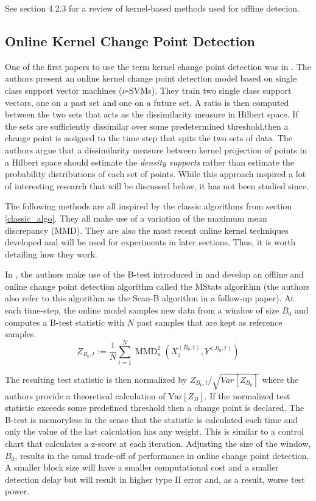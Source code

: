 See section 4.2.3 \cite{truong2018review} for a review of kernel-based methods used for offline detecion. 

\subsection{Online Kernel Change Point Detection}
One of the first papers to use the term kernel change point detection was in \cite{desobry2005online}. The authors present an online kernel change point detection model based on single class support vector machines ($\nu$-SVMs). They train two single class support vectors, one on a past set and one on a future set. A ratio is then computed between the two sets that acts as the dissimilarity measure in Hilbert space. If the sets are sufficiently dissimilar over some predetermined threshold,then a change point is assigned to the time step that spits the two sets of data. The authors argue that a dissimilarity measure between kernel projection of points in a Hilbert space should estimate the \textit{density supports} rather than estimate the probability distributions of each set of points. While this approach inspired a lot of interesting research that will be discussed below, it has not been studied since.

The following methods are all inspired by the classic algorithms from section \ref{classic_algo}. They all make use of a variation of the maximum mean discrepancy (MMD). They are also the most recent online kernel techniques developed and will be used for experiments in later sections. Thus, it is worth detailing how they work.

In  \cite{li2015m}, the authors make use of the B-test introduced in \cite{zaremba2013b} and develop an offline and online change point detection algorithm called the MStats algorithm (the authors also refer to this algorithm as the Scan-B algorithm in a follow-up paper). At each time-step, the online model samples new data from a window of size $B_0$ and computes a B-test statistic with $N$ past samples that are kept as reference samples. 
\begin{equation}
Z_{B_{0}, t}:=\frac{1}{N} \sum_{i=1}^{N} \operatorname{MMD}_{u}^{2}\left(X_{i}^{\left(B_{0}, t\right)}, Y^{\left(B_{0}, t\right)}\right)
\end{equation}

The resulting test statistic is then normalized by $Z_{B_{0}, t}/\sqrt{Var[Z_{B_0}]}$ where the authors provide a theoretical calculation of $\text{Var}[Z_B]$. If the normalized test statistic exceeds some predefined threshold then a change point is declared. The B-test is memoryless in the sense that the statistic is calculated each time and only the value of the last calculation has any weight. This is similar to a control chart that calculates a z-score at each iteration. Adjusting the size of the window, $B_0$, results in the usual trade-off of performance in online change point detection. A smaller block size will have a smaller computational cost and a smaller detection delay but will result in higher type II error and, as a result, worse test power.

